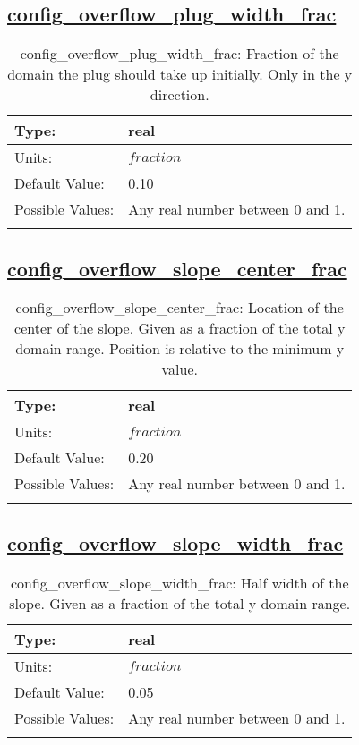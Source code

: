 \subsection[config\_overflow\_plug\_width\_frac]{\hyperref[sec:nm_tab_overflow]{config\_overflow\_plug\_width\_frac}}
\label{subsec:nm_sec_config_overflow_plug_width_frac}
\begin{center}
\begin{longtable}{| p{2.0in} || p{4.0in} |}
    \hline
    Type: & real \\
    \hline
    Units: & $fraction$ \\
    \hline
    Default Value: & 0.10 \\
    \hline
    Possible Values: & Any real number between 0 and 1. \\
    \hline
    \caption{config\_overflow\_plug\_width\_frac: Fraction of the domain the plug should take up initially. Only in the y direction.}
\end{longtable}
\end{center}
\subsection[config\_overflow\_slope\_center\_frac]{\hyperref[sec:nm_tab_overflow]{config\_overflow\_slope\_center\_frac}}
\label{subsec:nm_sec_config_overflow_slope_center_frac}
\begin{center}
\begin{longtable}{| p{2.0in} || p{4.0in} |}
    \hline
    Type: & real \\
    \hline
    Units: & $fraction$ \\
    \hline
    Default Value: & 0.20 \\
    \hline
    Possible Values: & Any real number between 0 and 1. \\
    \hline
    \caption{config\_overflow\_slope\_center\_frac: Location of the center of the slope. Given as a fraction of the total y domain range. Position is relative to the minimum y value.}
\end{longtable}
\end{center}
\subsection[config\_overflow\_slope\_width\_frac]{\hyperref[sec:nm_tab_overflow]{config\_overflow\_slope\_width\_frac}}
\label{subsec:nm_sec_config_overflow_slope_width_frac}
\begin{center}
\begin{longtable}{| p{2.0in} || p{4.0in} |}
    \hline
    Type: & real \\
    \hline
    Units: & $fraction$ \\
    \hline
    Default Value: & 0.05 \\
    \hline
    Possible Values: & Any real number between 0 and 1. \\
    \hline
    \caption{config\_overflow\_slope\_width\_frac: Half width of the slope. Given as a fraction of the total y domain range.}
\end{longtable}
\end{center}
